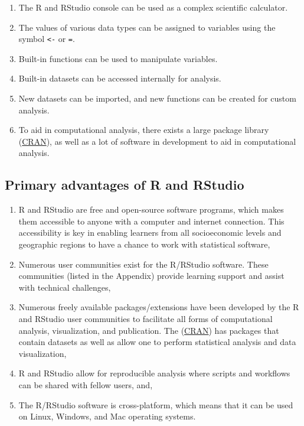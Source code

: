 \documentclass[
  letterpaper,
  DIV=11,
  numbers=noendperiod]{scrreprt}
\begin{document}
\begin{enumerate}
\def\labelenumi{\roman{enumi}.}
\item
  The R and RStudio console can be used as a complex scientific
  calculator.
\item
  The values of various data types can be assigned to variables using
  the symbol \texttt{\textless{}-} or \texttt{=}.
\item
  Built-in functions can be used to manipulate variables.
\item
  Built-in datasets can be accessed internally for analysis.
\item
  New datasets can be imported, and new functions can be created for
  custom analysis.
\item
  To aid in computational analysis, there exists a large package library
  (\href{https://cran.r-project.org/}{CRAN}), as well as a lot of
  software in development to aid in computational analysis.
\end{enumerate}

\subsection{Primary advantages of R and
RStudio}\label{primary-advantages-of-r-and-rstudio}

\begin{enumerate}
\def\labelenumi{\roman{enumi}.}
\item
  R and RStudio are free and open-source software programs, which makes
  them accessible to anyone with a computer and internet connection.
  This accessibility is key in enabling learners from all socioeconomic
  levels and geographic regions to have a chance to work with
  statistical software,
\item
  Numerous user communities exist for the R/RStudio software. These
  communities (listed in the Appendix) provide learning support and
  assist with technical challenges,
\item
  Numerous freely available packages/extensions have been developed by
  the R and RStudio user communities to facilitate all forms of
  computational analysis, visualization, and publication. The
  (\href{https://cran.r-project.org/}{CRAN}) has packages that contain
  datasets as well as allow one to perform statistical analysis and data
  visualization,
\item
  R and RStudio allow for reproducible analysis where scripts and
  workflows can be shared with fellow users, and,
\item
  The R/RStudio software is cross-platform, which means that it can be
  used on Linux, Windows, and Mac operating systems.
\end{enumerate}
\end{document}

